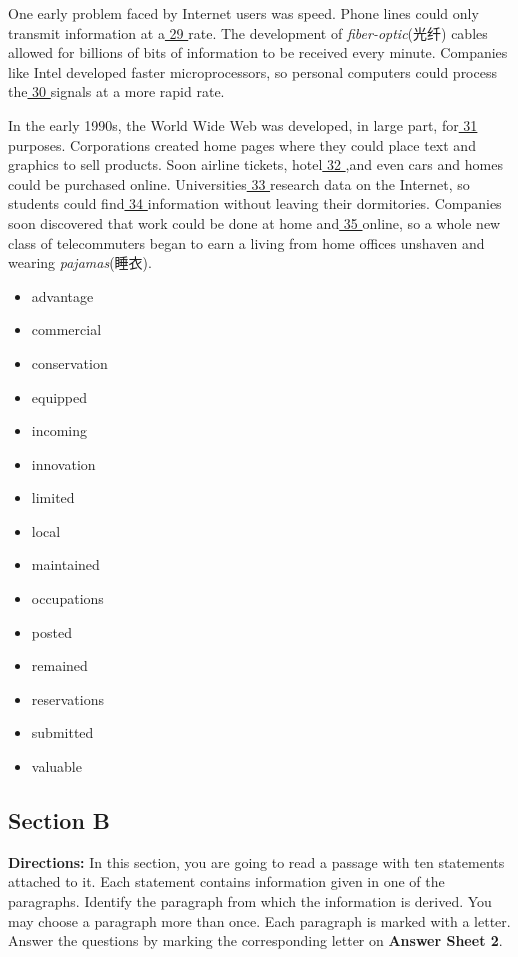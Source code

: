 \documentclass[UTF8,11pt]{ctexart}
\begin{document}
One early problem faced by Internet users was speed. Phone lines could only transmit information at a\uline{ 29 }rate. The development of\textit{ fiber-optic}(光纤) cables allowed for billions of bits of information to be received every minute. Companies like Intel developed faster microprocessors, so personal computers could process the\uline{ 30 }signals at a more rapid rate.


In the early 1990s, the World Wide Web was developed, in large part, for\uline{ 31 }purposes. Corporations created home pages where they could place text and graphics to sell products. Soon airline tickets, hotel\uline{ 32 },and even cars and homes could be purchased online. Universities\uline{ 33 }research data on the Internet, so students could find\uline{ 34 }information without leaving their dormitories. Companies soon discovered that work could be done at home and\uline{ 35 }online, so a whole new class of telecommuters began to earn a living from home offices unshaven and wearing\textit{ pajamas}(睡衣).


\begin{itemize}[leftmargin=2em,itemsep=.2em,topsep=.4em]\item[A.] advantage
\item[B.] commercial
\item[C.] conservation
\item[D.] equipped
\item[E.] incoming
\item[F.] innovation
\item[G.] limited
\item[H.] local
\item[I.] maintained
\item[J.] occupations
\item[K.] posted
\item[L.] remained
\item[M.] reservations
\item[N.] submitted
\item[O.] valuable
\end{itemize}

\subsection*{\textbf{Section B}}


\textbf{Directions:} In this section, you are going to read a passage with ten statements attached to it. Each statement contains information given in one of the paragraphs. Identify the paragraph from which the information is derived. You may choose a paragraph more than once. Each paragraph is marked with a letter. Answer the questions by marking the corresponding letter on\textbf{ Answer Sheet 2}.
\end{document}
